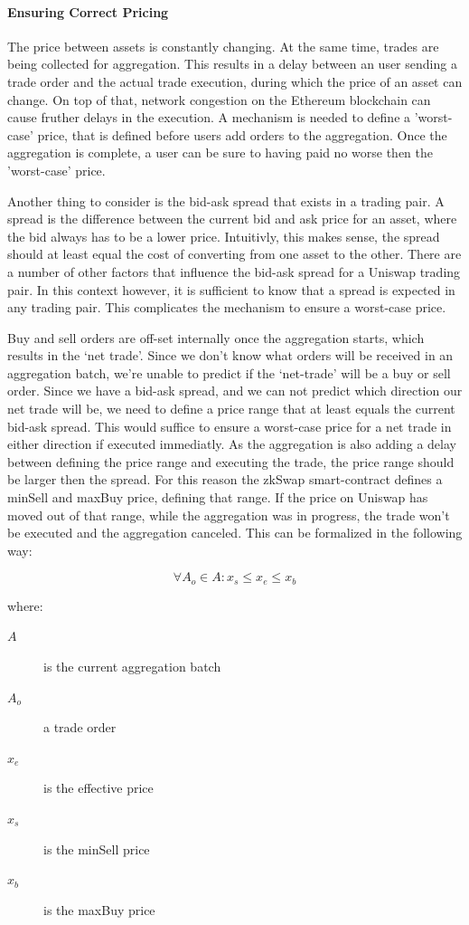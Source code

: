 \documentclass[../../thesis.tex]{subfiles}
\begin{document}
\paragraph{Ensuring Correct Pricing}
The price between assets is constantly changing. At the same time, trades are being collected for aggregation. This results in a delay between an user sending a trade order and the actual trade execution, during which the price of an asset can change. On top of that, network congestion on the Ethereum blockchain can cause fruther delays in the execution. A mechanism is needed to define a 'worst-case' price, that is defined before users add orders to the aggregation. Once the aggregation is complete, a user can be sure to having paid no worse then the 'worst-case' price.

Another thing to consider is the bid-ask spread that exists in a trading pair. A spread is the difference between the current bid and ask price for an asset, where the bid always has to be a lower price. Intuitivly, this makes sense, the spread should at least equal the cost of converting from one asset to the other. There are a number of other factors that influence the bid-ask spread for a Uniswap trading pair. In this context however, it is sufficient to know that a spread is expected in any trading pair. This complicates the mechanism to ensure a worst-case price. 

Buy and sell orders are off-set internally once the aggregation starts, which results in the `net trade'. Since we don't know what orders will be received in an aggregation batch, we're unable to predict if the `net-trade' will be a buy or sell order. Since we have a bid-ask spread, and we can not predict which direction our net trade will be, we need to define a price range that at least equals the current bid-ask spread. This would suffice to ensure a worst-case price for a net trade in either direction if executed immediatly.
As the aggregation is also adding a delay between defining the price range and executing the trade, the price range should be larger then the spread. For this reason the zkSwap smart-contract defines a minSell and maxBuy price, defining that range. If the price on Uniswap has moved out of that range, while the aggregation was in progress, the trade won't be executed and the aggregation canceled. This can be formalized in the following way: 

$$\forall A_o\in A: x_s \leq x_e \leq x_b$$


where:
\begin{description}
\item[$A$] is the current aggregation batch
\item[$A_o$] a trade order
\item[$x_e$] is the effective price 
\item[$x_s$] is the minSell price
\item[$x_b$] is the maxBuy price 
\end{description}
\end{document}
